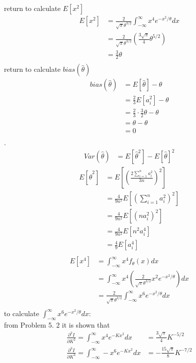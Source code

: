 \documentclass[12pt,border=4pt,multi]{article} %
\begin{document}
return to calculate $E[x^2]$
\begin{align*}
E[x^2] &= \frac{2}{\sqrt{\pi}\theta^{3 / 2}} \int_{-\infty}^{\infty} x^4 e^{-x^2 / \theta} dx\\
&= \frac{2}{\sqrt{\pi}\theta^{3 / 2}} \left(\frac{3\sqrt{\pi}}{4}\theta^{5 / 2}\right)\\
&= \frac{3}{2}\theta\\
\end{align*}
return to calculate $bias(\hat{\theta})$
\begin{align*}
bias(\hat{\theta}) &= E[\hat{\theta}] - \theta\\
&= \frac{2}{3} E[a_i^2] - \theta\\
&= \frac{2}{3}\cdot\frac{3}{2}\theta - \theta\\
&= \theta - \theta\\
&= \boxed{0}\\
\end{align*}
\newpage
{}.
\begin{align*}
Var(\hat{\theta}) &= E[\hat{\theta}^2] - E[\hat{\theta}]^2
\end{align*}
\begin{align*}
E[\hat{\theta}^2] &= E\left[\left(\frac{2\sum_{i = 1}^n a_i^2}{3n}\right)^2\right]\\
&= \frac{4}{9n^2}E\left[\left(\sum_{i = 1}^n a_i^2\right)^2\right]\\
&= \frac{4}{9n^2}E\left[(n a_i^2)^2\right]\\
&= \frac{4}{9n^2}E\left[n^2 a_i^4\right]\\
&= \frac{4}{9}E\left[a_i^4\right]\\
\end{align*}
\begin{align*}
E[x^4] &= \int_{-\infty}^{\infty} x^4 f_\theta(x) dx\\
&= \int_{-\infty}^{\infty} x^4 \left(\frac{2}{\sqrt{\pi}\theta^{3 / 2}} x^2 e^{-x^2 / \theta}\right) dx\\
&= \frac{2}{\sqrt{\pi}\theta^{3 / 2}} \int_{-\infty}^{\infty} x^6 e^{-x^2 / \theta} dx\\
\end{align*}
to calculate $\int_{-\infty}^{\infty} x^6 e^{-x^2 / \theta} dx$:\\
from Problem 5. 2 it is shown that 
\begin{align*}
\frac{\partial^2 I}{\partial K^2} = \int_{-\infty}^{\infty} x^4 e^{-Kx^2} dx &= \frac{3\sqrt{\pi}}{4}K^{-5 / 2}\\
\frac{\partial^3 I}{\partial K^3} = \int_{-\infty}^{\infty} -x^6 e^{-Kx^2} dx &= -\frac{15\sqrt{\pi}}{8}K^{-7 / 2}\\
\end{align*}
\end{document}
